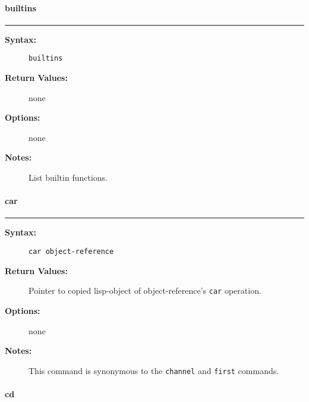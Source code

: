 \vspace {2pt}


\paragraph{builtins}

\hrule
\begin{description}
\item[{\bf Syntax:}] \mbox{}

{\tt builtins}

\item[{\bf Return Values:}] \mbox{}

none  

\item[{\bf Options:}] \mbox{}

none  

\item[{\bf Notes:}] \mbox{}

List builtin functions.

\end{description}


\vspace {2pt}


\paragraph{car}

\hrule
\begin{description}
\item[{\bf Syntax:}] \mbox{}

{\tt car object-reference}

\item[{\bf Return Values:}] \mbox{}

Pointer to copied lisp-object of 
object-reference's {\tt car} operation.

\item[{\bf Options:}] \mbox{}

none  

\item[{\bf Notes:}] \mbox{}

This command is synonymous to the {\tt channel} 
and {\tt first} commands.  

\end{description}


\vspace {2pt}


\paragraph{cd}

